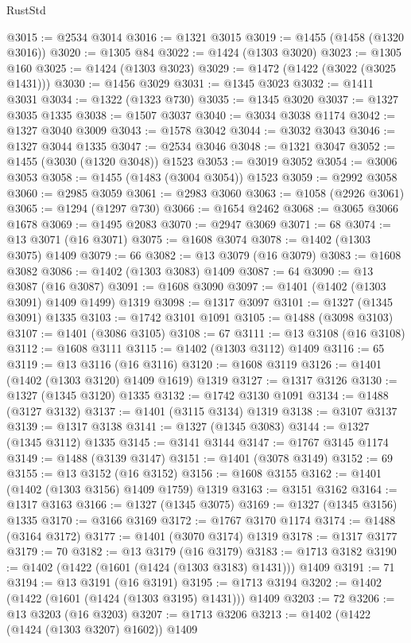 \begin{lexlean}{RustStd}
\begin{coremodule}
{\begin{coremodule}
{{{{{{{{{{{{{{{{{{{{{{{{{{{{{{{{{{{{{{@3015 := @2534 @3014
@3016 := @1321 @3015
@3019 := @1455 (@1458 (@1320 @3016))
@3020 := @1305 @84
@3022 := @1424 (@1303 @3020)
@3023 := @1305 @160
@3025 := @1424 (@1303 @3023)
@3029 := @1472 (@1422 (@3022 (@3025 @1431)))
@3030 := @1456 @3029
@3031 := @1345 @3023
@3032 := @1411 @3031
@3034 := @1322 (@1323 @730)
@3035 := @1345 @3020
@3037 := @1327 @3035 @1335
@3038 := @1507 @3037
@3040 := @3034 @3038 @1174
@3042 := @1327 @3040 @3009
@3043 := @1578 @3042
@3044 := @3032 @3043
@3046 := @1327 @3044 @1335
@3047 := @2534 @3046
@3048 := @1321 @3047
@3052 := @1455 (@3030 (@1320 @3048)) @1523
@3053 := @3019 @3052
@3054 := @3006 @3053
@3058 := @1455 (@1483 (@3004 @3054)) @1523
@3059 := @2992 @3058
@3060 := @2985 @3059
@3061 := @2983 @3060
@3063 := @1058 (@2926 @3061)
@3065 := @1294 (@1297 @730)
@3066 := @1654 @2462
@3068 := @3065 @3066 @1678
@3069 := @1495 @2083
@3070 := @2947 @3069
@3071 := 68
@3074 := @13 @3071 (@16 @3071)
@3075 := @1608 @3074
@3078 := @1402 (@1303 @3075) @1409
@3079 := 66
@3082 := @13 @3079 (@16 @3079)
@3083 := @1608 @3082
@3086 := @1402 (@1303 @3083) @1409
@3087 := 64
@3090 := @13 @3087 (@16 @3087)
@3091 := @1608 @3090
@3097 := @1401 (@1402 (@1303 @3091) @1409 @1499) @1319
@3098 := @1317 @3097
@3101 := @1327 (@1345 @3091) @1335
@3103 := @1742 @3101 @1091
@3105 := @1488 (@3098 @3103)
@3107 := @1401 (@3086 @3105)
@3108 := 67
@3111 := @13 @3108 (@16 @3108)
@3112 := @1608 @3111
@3115 := @1402 (@1303 @3112) @1409
@3116 := 65
@3119 := @13 @3116 (@16 @3116)
@3120 := @1608 @3119
@3126 := @1401 (@1402 (@1303 @3120) @1409 @1619) @1319
@3127 := @1317 @3126
@3130 := @1327 (@1345 @3120) @1335
@3132 := @1742 @3130 @1091
@3134 := @1488 (@3127 @3132)
@3137 := @1401 (@3115 @3134) @1319
@3138 := @3107 @3137
@3139 := @1317 @3138
@3141 := @1327 (@1345 @3083)
@3144 := @1327 (@1345 @3112) @1335
@3145 := @3141 @3144
@3147 := @1767 @3145 @1174
@3149 := @1488 (@3139 @3147)
@3151 := @1401 (@3078 @3149)
@3152 := 69
@3155 := @13 @3152 (@16 @3152)
@3156 := @1608 @3155
@3162 := @1401 (@1402 (@1303 @3156) @1409 @1759) @1319
@3163 := @3151 @3162
@3164 := @1317 @3163
@3166 := @1327 (@1345 @3075)
@3169 := @1327 (@1345 @3156) @1335
@3170 := @3166 @3169
@3172 := @1767 @3170 @1174
@3174 := @1488 (@3164 @3172)
@3177 := @1401 (@3070 @3174) @1319
@3178 := @1317 @3177
@3179 := 70
@3182 := @13 @3179 (@16 @3179)
@3183 := @1713 @3182
@3190 := @1402 (@1422 (@1601 (@1424 (@1303 @3183) @1431))) @1409
@3191 := 71
@3194 := @13 @3191 (@16 @3191)
@3195 := @1713 @3194
@3202 := @1402 (@1422 (@1601 (@1424 (@1303 @3195) @1431))) @1409
@3203 := 72
@3206 := @13 @3203 (@16 @3203)
@3207 := @1713 @3206
@3213 := @1402 (@1422 (@1424 (@1303 @3207) @1602)) @1409
}}}}}}}}}}}}}}}}}}}}}}}}}}}}}}}}}}}}}}
\end{coremodule}}
\end{coremodule}
\end{lexlean}
